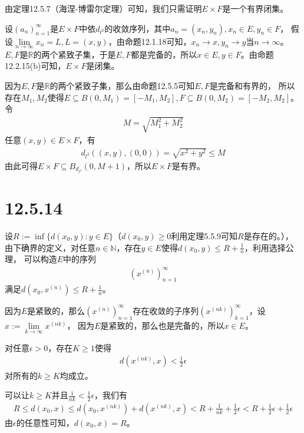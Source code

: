 \documentclass{article}
\begin{document}
由定理12.5.7（海涅-博雷尔定理）可知，我们只需证明$E \times F$是一个有界闭集。

设$(a_n)_{n = 1}^\infty$是$E \times F$中依$d_{l^2}$的收敛序列，其中$a_n = (x_n, y_n), x_n \in E, y_n \in F$，
假设$\lim \limits_{n \to \infty} x_n = L, L = (x, y)$，由命题12.1.18可知，$x_n \to x, y_n \to y$当$n \to \infty$。
$E,F$是$\mathbb{R}$的两个紧致子集，于是$E,F$都是完备的，所以$x \in E, y \in F$。由命题12.2.15(b)可知，$E \times F$是闭集。

因为$E,F$是$\mathbb{R}$的两个紧致子集，那么由命题12.5.5可知$E,F$是完备和有界的，
所以存在$M_1, M_2$使得$E \subseteq B(0, M_1) = [-M_1, M_2], F \subseteq B(0, M_2) = [-M_2, M_2]$。
令
\begin{align*}
  M = \sqrt{M_1^2 + M_2^2}
\end{align*}
任意$(x, y) \in E \times F$，有
\begin{align*}
  d_{l^2}((x, y), (0, 0)) = \sqrt{x^2 + y^2} \leq M
\end{align*}
由此可得$E \times F \subseteq B_{d_{l^2}}(0, M+1)$，所以$E \times F$是有界。

\section*{12.5.14}

设$R := \inf\{d(x_0, y) : y \in E\}$（$d(x_0, y) \geq 0$利用定理5.5.9可知$R$是存在的。），
由下确界的定义，对任意$n \in \mathbb{N}$，存在$y \in E$使得$d(x_0, y) \leq R + \frac{1}{n}$，利用选择公理，
可以构造$E$中的序列
\begin{align*}
  (x^{(n)})_{n=1}^\infty
\end{align*}
满足$d(x_0, x^{(n)}) \leq R + \frac{1}{n}$。

因为$E$是紧致的，那么$(x^{(n)})_{n=1}^\infty$存在收敛的子序列$(x^{(nk)})_{k=1}^\infty$，设$x := \lim \limits_{k \to \infty} x^{(nk)}$，
因为$E$是紧致的，那么也是完备的，所以$x \in E$。

对任意$\epsilon > 0$，存在$K \geq 1$使得
\begin{align*}
  d(x^{(nk)}, x) < \frac{1}{2}\epsilon
\end{align*}
对所有的$k \geq K$均成立。

可以让$k \geq K$并且$\frac{1}{nk} < \frac{1}{2}\epsilon$，我们有
\begin{align*}
  R \leq d(x_0, x) \leq d(x_0, x^{(nk)}) + d(x^{(nk)}, x) < R + \frac{1}{nk} + \frac{1}{2}\epsilon < R + \frac{1}{2}\epsilon + \frac{1}{2}\epsilon
\end{align*}
由$\epsilon$的任意性可知，$d(x_0, x) = R$。
\end{document}
